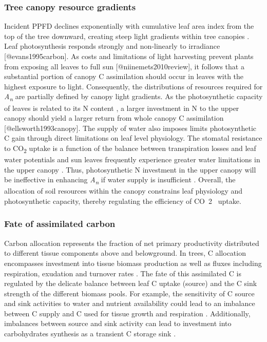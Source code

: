 \documentclass[a4paper]{article}
\begin{document}
\subsubsection*{Tree canopy resource gradients}
Incident PPFD declines exponentially with cumulative leaf area index from the top of the tree downward, creating steep light gradients within tree canopies \citep{monsi2005factor}. Leaf photosynthesis responds strongly and non-linearly to irradiance [@evans1995carbon]. As costs and limitations of light harvesting prevent plants from exposing all leaves to full sun [@niinemets2010review], it follows that a substantial portion of canopy C assimilation should occur in leaves with the highest exposure to light. Consequently, the distributions of resources required for \textit{A\textsubscript{n}} are partially defined by canopy light gradients. As the photosynthetic capacity of leaves is related to its N content \citep{field1986photosynthesis}, a larger investment in N to the upper canopy should yield a larger return from whole canopy C assimilation [@ellsworth1993canopy]. The supply of water also imposes limits photosynthetic C gain through direct limitations on leaf level physiology. The stomatal resistance to CO\textsubscript{2} uptake is a function of the balance between transpiration losses and leaf water potentials \citep{farquhar1982stomatal} and sun leaves frequently experience greater water limitations in the upper canopy \citep{sellin2008effects, niinemets2012optimization}. Thus, photosynthetic N investment in the upper canopy will be ineffective in enhancing \textit{A\textsubscript{n}} if water supply is insufficient \citep{niinemets2012optimization, peltoniemi2012co}. Overall, the allocation of soil resources within the canopy constrains leaf physiology and photosynthetic capacity, thereby regulating the efficiency of CO~2~ uptake.    

\subsubsection*{Fate of assimilated carbon}
Carbon allocation represents the fraction of net primary productivity distributed to different tissue components above and belowground. In trees, C allocation encompasses investment into tissue biomass production as well as fluxes including respiration, exudation and turnover rates \citep{litton2007carbon}. The fate of this assimilated C is regulated by the delicate balance between leaf C uptake (source) and the C sink strength of the different biomass pools. For example, the sensitivity of C source and sink activities to water and nutrient availability could lead to an imbalance between C supply and C used for tissue growth and respiration \citep{fatichi2014moving}. Additionally, imbalances between source and sink activity can lead to investment into carbohydrates synthesis as a transient C storage sink \citep{paul2001sink}.
\end{document}
